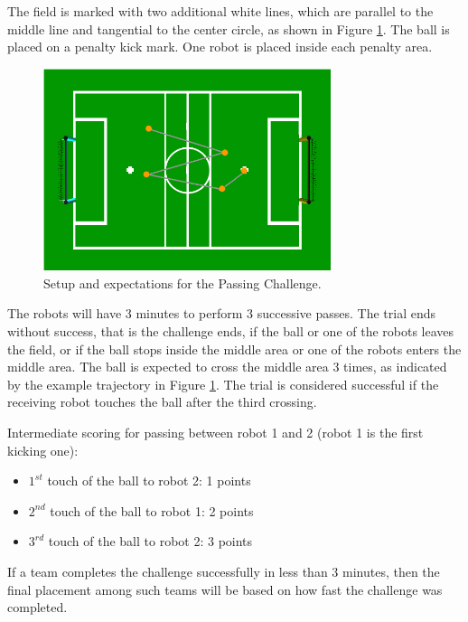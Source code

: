 \documentclass{article}
\begin{document}
The field is marked with two additional white lines, which are parallel to the middle line and tangential to the center circle, as shown in Figure \ref{fig:passingchallenge}. The ball is placed on a penalty kick mark.
One robot is placed inside each penalty area.

\begin{figure}[htbp]
 \centering
 \includegraphics[width=0.75\textwidth]{figures/nao_passingchallenge.png}
 \caption{Setup and expectations for the Passing Challenge.}
 \label{fig:passingchallenge}
\end{figure}

The robots will have 3 minutes to perform 3 successive passes. The trial ends without success, that is the challenge ends, if the ball or one of the robots leaves the field, or if the ball stops inside the middle area or one of the robots enters the middle area. The ball is expected to cross the middle area 3 times, as indicated by the example trajectory in Figure \ref{fig:passingchallenge}. The trial is considered successful if the receiving robot touches the ball after the third crossing.

Intermediate scoring for passing between robot 1 and 2 (robot 1 is the first kicking one):
\begin{itemize}
 \item $1^{st}$ touch of the ball to robot 2:  1 points
 \item $2^{nd}$ touch of the ball to robot 1:  2 points
 \item $3^{rd}$ touch of the ball to robot 2:  3 points
\end{itemize}

If a team completes the challenge successfully in less than 3 minutes, then the final placement among such teams will be based on how fast the challenge was completed.
\end{document}
